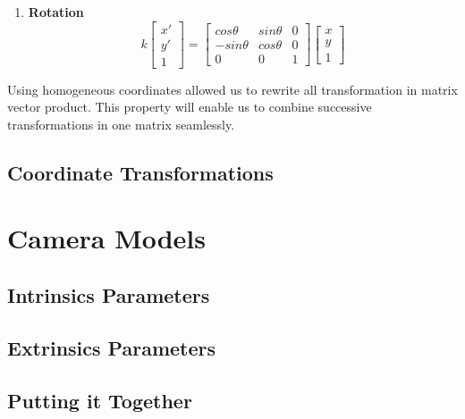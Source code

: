 \documentclass{book}
\begin{document}
\begin{enumerate}
                    \item \textbf{Rotation} \begin{equation}
                        k\begin{bmatrix}
                            x'\\ 
                            y'\\ 
                            1
                            \end{bmatrix} = 
                            \begin{bmatrix}
                            cos\theta & sin\theta & 0\\ 
                            -sin\theta & cos\theta & 0\\ 
                            0 & 0 & 1
                            \end{bmatrix}
                            \begin{bmatrix}
                            x\\ 
                            y\\ 
                            1
                            \end{bmatrix}
                    \end{equation}
                \end{enumerate}
                Using homogeneous coordinates allowed us to rewrite all transformation in matrix vector product. This property
                will enable us to combine successive transformations in one matrix seamlessly. 

            \subsection{Coordinate Transformations}


        \section{Camera Models}
            \subsection{Intrinsics Parameters}

            \subsection{Extrinsics Parameters}

            \subsection{Putting it Together}
\end{document}
